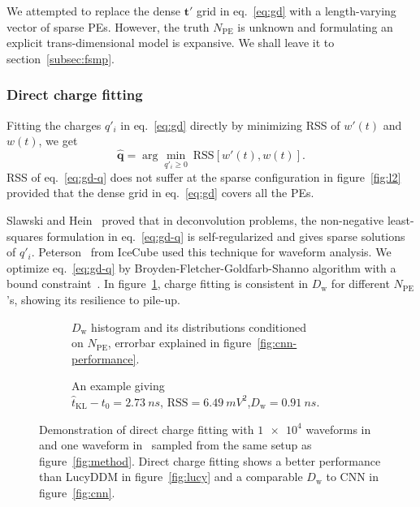 We attempted to replace the dense $\bm{t'}$ grid in eq.~\eqref{eq:gd} with a length-varying vector of sparse PEs. However, the truth $N_\mathrm{PE}$ is unknown and formulating an explicit trans-dimensional model is expansive.  We shall leave it to section~\ref{subsec:fsmp}.

\subsubsection{Direct charge fitting}
\label{sec:dcf}

Fitting the charges $q'_i$ in eq.~\eqref{eq:gd} directly by minimizing RSS of $w'(t)$ and $w(t)$, we get
\begin{equation}
  \label{eq:gd-q}
  \bm{\hat{q}} = \arg \underset{q'_i \ge 0}{\min}~\mathrm{RSS}\left[w'(t),w(t)\right].
\end{equation}
RSS of eq.~\eqref{eq:gd-q} does not suffer at the sparse configuration in figure~\ref{fig:l2} provided that the dense grid in eq.~\eqref{eq:gd} covers all the PEs.

Slawski and Hein~\cite{slawski_non-negative_2013} proved that in deconvolution problems, the non-negative least-squares formulation in eq.~\eqref{eq:gd-q} is self-regularized and gives sparse solutions of $q'_i$.  Peterson~\cite{peterson_developments_2021} from IceCube used this technique for waveform analysis.  We optimize eq.~\eqref{eq:gd-q} by Broyden-Fletcher-\allowbreak{}Goldfarb-Shanno algorithm with a bound constraint~\cite{byrd_limited_1995}.  In figure~\ref{fig:fitting-npe}, charge fitting is consistent in $D_\mathrm{w}$ for different $N_\mathrm{PE}$'s, showing its resilience to pile-up.

\begin{figure}[H]
  \begin{subfigure}{.5\textwidth}
    \centering
    \resizebox{\textwidth}{!}{}
    \caption{\label{fig:fitting-npe} $D_\mathrm{w}$ histogram and its distributions conditioned \\ on $N_{\mathrm{PE}}$, errorbar explained in figure~\ref{fig:cnn-performance}.}
  \end{subfigure}
  \begin{subfigure}{.5\textwidth}
    \centering
    \resizebox{\textwidth}{!}{}
    \caption{\label{fig:fitting}An example giving \\ $\hat{t}_\mathrm{KL} - t_0=\SI{2.73}{ns}$, $\mathrm{RSS}=\SI{6.49}{mV^2}$,$D_\mathrm{w}=\SI{0.91}{ns}$.}
  \end{subfigure}
  \caption{\label{fig:dcf}Demonstration of direct charge fitting with $\num[retain-unity-mantissa=false]{1e4}$ waveforms in~ and one waveform in~ sampled from the same setup as figure~\ref{fig:method}.  Direct charge fitting shows a better performance than LucyDDM in figure~\ref{fig:lucy} and a comparable $D_\mathrm{w}$ to CNN in figure~\ref{fig:cnn}.}
\end{figure}

